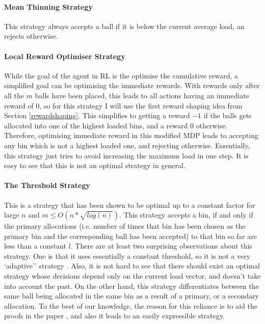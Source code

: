 \paragraph{Mean Thinning Strategy}
This strategy always accepts a ball if it is below the current average load, an rejects otherwise.


\paragraph{Local Reward Optimiser Strategy}

While the goal of the agent in RL is the optimise the cumulative reward, a simplified goal can be optimising the immediate rewards. With rewards only after all the $m$ balls have been placed, this leads to all actions having an immediate reward of $0$, so for this strategy I will use the first reward shaping idea from Section \ref{rewardshaping}. This simplifies to getting a reward $-1$ if the balls gets allocated into one of the highest loaded bins, and a reward $0$ otherwise. Therefore, optimising immediate reward in this modified MDP leads to accepting any bin which is not a highest loaded one, and rejecting otherwise. Essentially, this strategy just tries to avoid increasing the maximum load in one step. It is easy to see that this is not an optimal strategy in general. 


\paragraph{The Threshold Strategy} 

This is a strategy that has been shown to be optimal \cite{feldheim2021thinning} up to a constant factor for large $n$ and $m\leq O(n*\sqrt{log(n)})$. This strategy accepts a bin, if and only if the primary allocations (i.e. number of times that bin has been chosen as the primary bin and the corresponding ball has been accepted) to that bin so far are less than a constant $l$. There are at least two surprising observations about this strategy. One is that it uses essentially a constant threshold, so it is not a very `adaptive'' strategy . Also, it is not hard to see that there should exist an optimal strategy whose decisions depend only on the current load vector, and doesn't take into account the past. On the other hand, this strategy differentiates between the same ball being allocated in the same bin as a result of a primary, or a secondary allocation. To the best of our knowledge, the reason for this reliance is to aid the proofs in the paper \cite{feldheim2021thinning}, and also it leads to an easily expressible strategy. 


